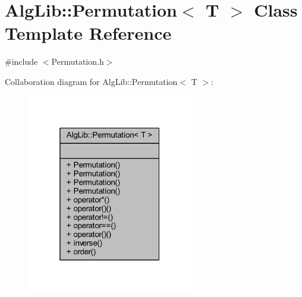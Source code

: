 \hypertarget{class_alg_lib_1_1_permutation}{}\section{Alg\+Lib\+:\+:Permutation$<$ T $>$ Class Template Reference}
\label{class_alg_lib_1_1_permutation}


{\ttfamily \#include $<$Permutation.\+h$>$}



Collaboration diagram for Alg\+Lib\+:\+:Permutation$<$ T $>$\+:\nopagebreak
\begin{figure}[H]
\begin{center}
\leavevmode
\includegraphics[width=205pt]{class_alg_lib_1_1_permutation__coll__graph}
\end{center}
\end{figure}
